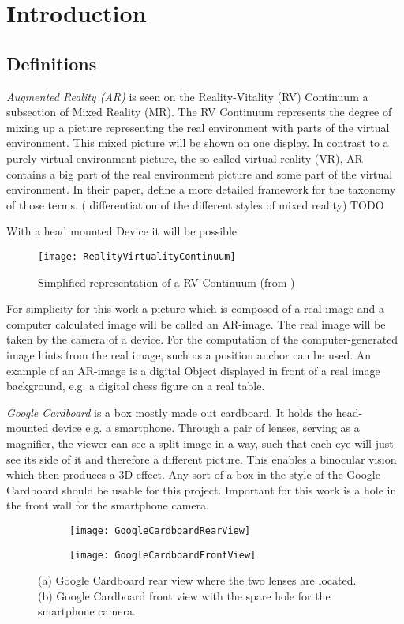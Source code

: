 \chapter{Introduction}
\label{chp:introduction}

\section{Definitions}

\emph{Augmented Reality (AR)} is seen on the Reality-Vitality (RV) Continuum a subsection of Mixed Reality (MR). The RV Continuum represents the degree of mixing up a picture representing the real environment with parts of the virtual environment. This mixed picture will be shown on one display. In contrast to a purely virtual environment picture, the so called virtual reality (VR), AR contains a big part of the real environment picture and some part of the virtual environment.
In their paper, \cite{Milgram1994AugmentedContinuum} define a more detailed framework for the taxonomy of those terms. (
differentiation of the different styles of mixed reality) TODO

With a head mounted Device it will be possible 

\begin{figure}[h]
    \centering
    \texttt{[image: RealityVirtualityContinuum]}
    \caption{Simplified representation of a RV Continuum (from \cite{Milgram1994AugmentedContinuum})}
\end{figure}
\noindent
For simplicity for this work  a picture which is composed of a real image and a computer calculated image will be called an AR-image. The real image will be taken by the camera of a device. For the computation of the computer-generated image hints from the real image, such as a position anchor can be used. An example of an AR-image is a digital Object displayed in front of a real image background, e.g. a digital chess figure on a real table.

\emph{Google Cardboard} is a box mostly made out cardboard. It holds the head-mounted device e.g. a smartphone. Through a pair of lenses, serving as a magnifier, the viewer can see a split image in a way, such that each eye will just see its side of it and therefore a different picture. This enables a binocular vision which then produces a 3D effect.
Any sort of a box in the style of the Google Cardboard should be usable for this project. Important for this work is a hole in the front wall for the smartphone camera. 
\begin{figure}
	\begin{subfigure}[t]{0.45\textwidth}
		\centering
		\texttt{[image: GoogleCardboardRearView]}
		\caption{}
	\end{subfigure}
	\hfill
	\begin{subfigure}[t]{0.45\textwidth}
		\centering
		\texttt{[image: GoogleCardboardFrontView]}
		\caption{}
	\end{subfigure}
	\caption[Google Cardboard with smartphone]
			{(a) Google Cardboard rear view where the two lenses are located.
			 (b) Google Cardboard front view with the spare hole for the smartphone camera.}
\end{figure}


